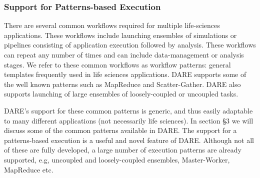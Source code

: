 \documentclass[]{svjour3}
\begin{document}
\subsubsection{Support for Patterns-based Execution}

There are several common workflows required for multiple life-sciences
applications. These workflows include launching ensembles of simulations
or pipelines consisting of application execution followed by analysis.
These workflows can repeat any number of times and can include
data-management or analysis stages. We refer to these common workflows
as workflow patterns: general templates frequently used in life sciences
applications. DARE supports some of the well known patterns such as MapReduce
and Scatter-Gather. DARE also supports launching of large ensembles
of loosely-coupled or uncoupled tasks. 


DARE's support for these common patterns is generic, and thus easily
adaptable to many different applications (not necessarily life sciences).
In section \S3 we will discuss some of the common patterns available
in DARE. The support for a patterns-based execution is a useful and novel
feature of DARE. Although not all of these are fully developed,
a large number of execution patterns are already supported, e.g,
uncoupled and loosely-coupled ensembles, Master-Worker, MapReduce etc.



\end{document}
